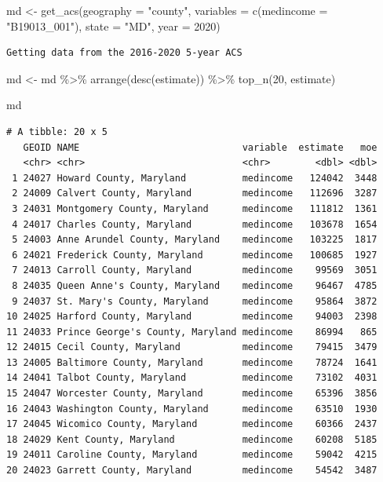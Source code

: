 \documentclass[
  letterpaper,
  DIV=11,
  numbers=noendperiod]{scrreprt}
\newenvironment{Shaded}{\begin{snugshade}}{\end{snugshade}}
\newcommand{\AttributeTok}[1]{\textcolor[rgb]{0.40,0.45,0.13}{#1}}
\newcommand{\DecValTok}[1]{\textcolor[rgb]{0.68,0.00,0.00}{#1}}
\newcommand{\FunctionTok}[1]{\textcolor[rgb]{0.28,0.35,0.67}{#1}}
\newcommand{\NormalTok}[1]{\textcolor[rgb]{0.00,0.23,0.31}{#1}}
\newcommand{\OtherTok}[1]{\textcolor[rgb]{0.00,0.23,0.31}{#1}}
\newcommand{\SpecialCharTok}[1]{\textcolor[rgb]{0.37,0.37,0.37}{#1}}
\newcommand{\StringTok}[1]{\textcolor[rgb]{0.13,0.47,0.30}{#1}}
\begin{document}
\begin{Shaded}
\begin{Highlighting}[]
\NormalTok{md }\OtherTok{\textless{}{-}} \FunctionTok{get\_acs}\NormalTok{(}\AttributeTok{geography =} \StringTok{"county"}\NormalTok{,}
              \AttributeTok{variables =} \FunctionTok{c}\NormalTok{(}\AttributeTok{medincome =} \StringTok{"B19013\_001"}\NormalTok{),}
              \AttributeTok{state =} \StringTok{"MD"}\NormalTok{,}
              \AttributeTok{year =} \DecValTok{2020}\NormalTok{)}
\end{Highlighting}
\end{Shaded}

\begin{verbatim}
Getting data from the 2016-2020 5-year ACS
\end{verbatim}

\begin{Shaded}
\begin{Highlighting}[]
\NormalTok{md }\OtherTok{\textless{}{-}}\NormalTok{ md }\SpecialCharTok{\%\textgreater{}\%} \FunctionTok{arrange}\NormalTok{(}\FunctionTok{desc}\NormalTok{(estimate)) }\SpecialCharTok{\%\textgreater{}\%} \FunctionTok{top\_n}\NormalTok{(}\DecValTok{20}\NormalTok{, estimate)}

\NormalTok{md}
\end{Highlighting}
\end{Shaded}

\begin{verbatim}
# A tibble: 20 x 5
   GEOID NAME                             variable  estimate   moe
   <chr> <chr>                            <chr>        <dbl> <dbl>
 1 24027 Howard County, Maryland          medincome   124042  3448
 2 24009 Calvert County, Maryland         medincome   112696  3287
 3 24031 Montgomery County, Maryland      medincome   111812  1361
 4 24017 Charles County, Maryland         medincome   103678  1654
 5 24003 Anne Arundel County, Maryland    medincome   103225  1817
 6 24021 Frederick County, Maryland       medincome   100685  1927
 7 24013 Carroll County, Maryland         medincome    99569  3051
 8 24035 Queen Anne's County, Maryland    medincome    96467  4785
 9 24037 St. Mary's County, Maryland      medincome    95864  3872
10 24025 Harford County, Maryland         medincome    94003  2398
11 24033 Prince George's County, Maryland medincome    86994   865
12 24015 Cecil County, Maryland           medincome    79415  3479
13 24005 Baltimore County, Maryland       medincome    78724  1641
14 24041 Talbot County, Maryland          medincome    73102  4031
15 24047 Worcester County, Maryland       medincome    65396  3856
16 24043 Washington County, Maryland      medincome    63510  1930
17 24045 Wicomico County, Maryland        medincome    60366  2437
18 24029 Kent County, Maryland            medincome    60208  5185
19 24011 Caroline County, Maryland        medincome    59042  4215
20 24023 Garrett County, Maryland         medincome    54542  3487
\end{verbatim}
\end{document}
